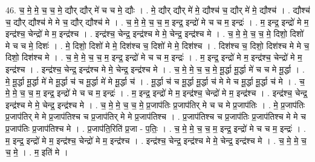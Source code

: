 \documentclass[17pt]{extarticle}
\begin{document}
46. च॒ मे॒ मे॒ च॒ च॒ मे॒ द्यौर् द्यौर् मे॑ च च मे॒ द्यौः । . मे॒ द्यौर् द्यौर् मे॑ मे॒ द्यौश्च॑ च॒ द्यौर् मे॑ मे॒ द्यौश्च॑ । . द्यौश्च॑ च॒ द्यौर् द्यौश्च॑ मे मे च॒ द्यौर् द्यौश्च॑ मे । . च॒ मे॒ मे॒ च॒ च॒ म॒ इन्द्र॒ इन्द्रो॑ मे च च म॒ इन्द्रः॑ । . म॒ इन्द्र॒ इन्द्रो॑ मे म॒ इन्द्र॑श्च॒ चेन्द्रो॑ मे म॒ इन्द्र॑श्च । . इन्द्र॑श्च॒ चेन्द्र॒ इन्द्र॑श्च मे मे॒ चेन्द्र॒ इन्द्र॑श्च मे । . च॒ मे॒ मे॒ च॒ च॒ मे॒ दिशो॒ दिशो॑ मे च च मे॒ दिशः॑ । . मे॒ दिशो॒ दिशो॑ मे मे॒ दिश॑श्च च॒ दिशो॑ मे मे॒ दिश॑श्च । . दिश॑श्च च॒ दिशो॒ दिश॑श्च मे मे च॒ दिशो॒ दिश॑श्च मे । . च॒ मे॒ मे॒ च॒ च॒ म॒ इन्द्र॒ इन्द्रो॑ मे च च म॒ इन्द्रः॑ । . म॒ इन्द्र॒ इन्द्रो॑ मे म॒ इन्द्र॑श्च॒ चेन्द्रो॑ मे म॒ इन्द्र॑श्च । . इन्द्र॑श्च॒ चेन्द्र॒ इन्द्र॑श्च मे मे॒ चेन्द्र॒ इन्द्र॑श्च मे । . च॒ मे॒ मे॒ च॒ च॒ मे॒ मू॒र्द्धा मू॒र्द्धा मे॑ च च मे मू॒र्द्धा । . मे॒ मू॒र्द्धा मू॒र्द्धा मे॑ मे मू॒र्द्धा च॑ च मू॒र्द्धा मे॑ मे मू॒र्द्धा च॑ । . मू॒र्द्धा च॑ च मू॒र्द्धा मू॒र्द्धा च॑ मे मे च मू॒र्द्धा मू॒र्द्धा च॑ मे । . च॒ मे॒ मे॒ च॒ च॒ म॒ इन्द्र॒ इन्द्रो॑ मे च च म॒ इन्द्रः॑ । . म॒ इन्द्र॒ इन्द्रो॑ मे म॒ इन्द्र॑श्च॒ चेन्द्रो॑ मे म॒ इन्द्र॑श्च । . इन्द्र॑श्च॒ चेन्द्र॒ इन्द्र॑श्च मे मे॒ चेन्द्र॒ इन्द्र॑श्च मे । . च॒ मे॒ मे॒ च॒ च॒ मे॒ प्र॒जाप॑तिः प्र॒जाप॑तिर् मे च च मे प्र॒जाप॑तिः । . मे॒ प्र॒जाप॑तिः प्र॒जाप॑तिर् मे मे प्र॒जाप॑तिश्च च प्र॒जाप॑तिर् मे मे प्र॒जाप॑तिश्च । . प्र॒जाप॑तिश्च च प्र॒जाप॑तिः प्र॒जाप॑तिश्च मे मे च प्र॒जाप॑तिः प्र॒जाप॑तिश्च मे । . प्र॒जाप॑ति॒रिति॑ प्र॒जा - प॒तिः॒ । . च॒ मे॒ मे॒ च॒ च॒ म॒ इन्द्र॒ इन्द्रो॑ मे च च म॒ इन्द्रः॑ । . म॒ इन्द्र॒ इन्द्रो॑ मे म॒ इन्द्र॑श्च॒ चेन्द्रो॑ मे म॒ इन्द्र॑श्च । . इन्द्र॑श्च॒ चेन्द्र॒ इन्द्र॑श्च मे मे॒ चेन्द्र॒ इन्द्र॑श्च मे । . च॒ मे॒ मे॒ च॒ च॒ मे॒ । . म॒ इति॑ मे । \newline
\pagebreak
{}
\end{document}
